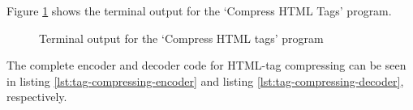 \documentclass[letterpaper,11pt]{article}
\begin{document}
Figure \ref{fig:compressedTag} shows the terminal output for the `Compress HTML Tags' program. 

\begin{figure}[H]


	\centering

	\caption{Terminal output for the `Compress HTML tags' program}

	\label{fig:compressedTag}

\end{figure}

The complete encoder and decoder code for HTML-tag compressing can be seen in listing \ref{lst:tag-compressing-encoder} and listing \ref{lst:tag-compressing-decoder}, respectively.
\end{document}

